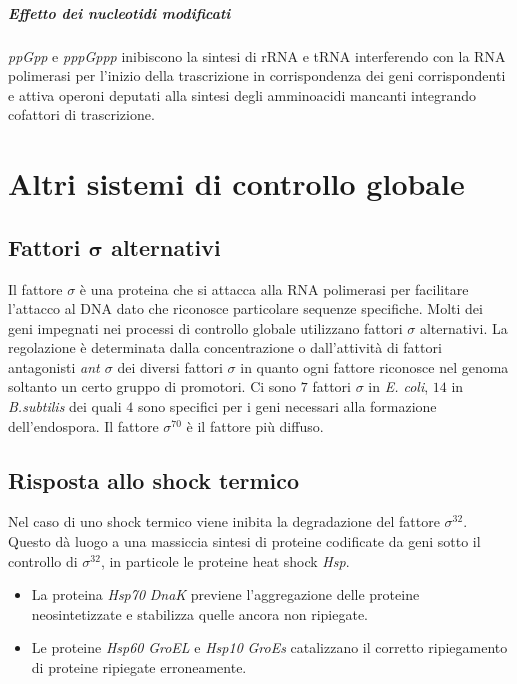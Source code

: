 				\subparagraph{Effetto dei nucleotidi modificati}
				\emph{ppGpp} e \emph{pppGppp} inibiscono la sintesi di rRNA e tRNA interferendo con la RNA polimerasi per l'inizio della trascrizione in corrispondenza dei geni corrispondenti e attiva operoni deputati alla sintesi degli amminoacidi mancanti integrando cofattori di trascrizione.

\section{Altri sistemi di controllo globale}

	\subsection{Fattori $\mathbf{\sigma}$ alternativi}
	Il fattore $\sigma$ è una proteina che si attacca alla RNA polimerasi per facilitare l'attacco al DNA dato che riconosce particolare sequenze specifiche. 
	Molti dei geni impegnati nei processi di controllo globale utilizzano fattori $\sigma$ alternativi. 
	La regolazione è determinata dalla concentrazione o dall'attività di fattori antagonisti \emph{ant $\sigma$} dei diversi fattori $\sigma$ in quanto ogni fattore riconosce nel genoma soltanto un certo gruppo di promotori. 
	Ci sono $7$ fattori $\sigma$ in \textit{E. coli}, $14$ in \textit{B.subtilis} dei quali $4$ sono specifici per i geni necessari alla formazione dell'endospora. 
	Il fattore $\sigma^{70}$ è il fattore più diffuso. 


	\subsection{Risposta allo shock termico}
	Nel caso di uno shock termico viene inibita la degradazione del fattore $\sigma^{32}$. 
	Questo dà luogo a una massiccia sintesi di proteine codificate da geni sotto il controllo di $\sigma^{32}$, in particole le proteine heat shock \emph{Hsp}.
	\begin{multicols}{2}
	\begin{itemize}
    		\item La proteina \emph{Hsp70} \emph{DnaK} previene l'aggregazione delle proteine neosintetizzate e stabilizza quelle ancora non ripiegate.
    		\item Le proteine \emph{Hsp60} \emph{GroEL} e \emph{Hsp10} \emph{GroEs} catalizzano il corretto ripiegamento di proteine ripiegate erroneamente. 
	\end{itemize}
	\end{multicols}

